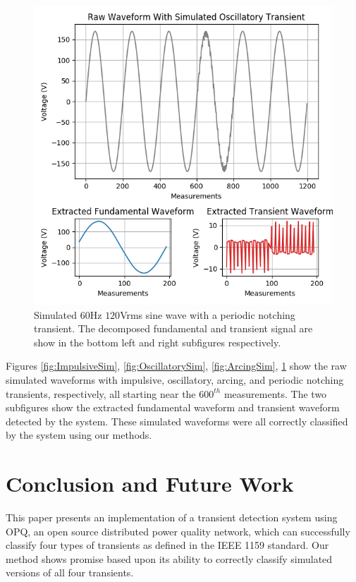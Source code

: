 \documentclass[10pt, conference, compsocconf]{IEEEtran}
\begin{document}
\begin{figure}[htbp]
\centering%
\includegraphics[scale=0.35]{./figures/notching_sim.png}
\caption{Simulated $60$Hz $120$Vrms sine wave with a periodic notching transient. The decomposed fundamental and transient signal are show in the bottom left and right subfigures respectively.}\label{fig:NotchingSim}
\end{figure}

Figures \ref{fig:ImpulsiveSim}, \ref{fig:OscillatorySim}, \ref{fig:ArcingSim}, \ref{fig:NotchingSim} show the raw simulated waveforms with impulsive, oscillatory, arcing, and periodic notching transients, respectively, all starting near the $600^{th}$ measurements. The two subfigures show the extracted fundamental waveform and transient waveform detected by the system. These simulated waveforms were all correctly classified by the system using our methods.

\section{Conclusion and Future Work}
\label{sec:Conlcusion}

This paper presents an implementation of a transient detection system using OPQ, an open source distributed power quality network, which can successfully classify four types of transients as defined in the IEEE 1159 standard. Our method shows promise based upon its ability to correctly classify simulated versions of all four transients.
\end{document}
